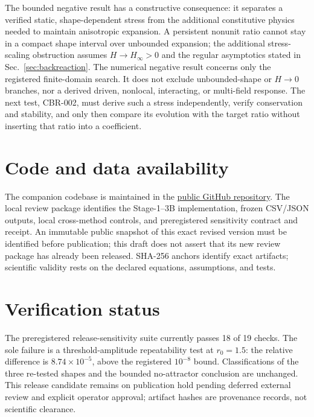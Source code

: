 \documentclass[aps,prd,reprint,superscriptaddress,nofootinbib,floatfix,showkeys]{revtex4-2}
\begin{document}
The bounded negative result has a constructive consequence: it separates a
verified static, shape-dependent stress from the additional constitutive
physics needed to maintain anisotropic expansion. A persistent nonunit ratio
cannot stay in a compact shape interval over unbounded expansion; the
additional stress-scaling obstruction assumes \(H\to H_\infty>0\) and the
regular asymptotics stated in Sec.~\ref{sec:backreaction}. The numerical
negative result concerns only the registered finite-domain search. It does
not exclude unbounded-shape or \(H\to0\) branches, nor a derived
driven, nonlocal, interacting, or multi-field response.  The next test,
CBR-002, must derive such a stress independently, verify conservation and
stability, and only then compare its evolution with the target ratio without
inserting that ratio into a coefficient.

\section*{Code and data availability}

\begingroup
\raggedright
The companion codebase is maintained in the
\href{https://github.com/brendohxd/ITSM-Integrated-Toroidal-Syntropic-Model}{public GitHub repository}.
The local review package identifies the Stage-1--3B implementation, frozen
CSV/JSON outputs, local cross-method controls, and preregistered sensitivity
contract and receipt. An immutable public snapshot of this exact revised
version must be identified before publication; this draft does not assert
that its new review package has already been released.
SHA-256 anchors identify exact artifacts; scientific validity rests on the
declared equations, assumptions, and tests.
\par
\endgroup

\section*{Verification status}

The preregistered release-sensitivity suite currently passes 18 of 19 checks.
The sole failure is a threshold-amplitude repeatability test at \(r_0=1.5\):
the relative difference is \(8.74\times10^{-5}\), above the registered
\(10^{-8}\) bound. Classifications of the three re-tested shapes and the bounded
no-attractor conclusion are unchanged.  This release candidate remains on
publication hold pending deferred external review and explicit operator
approval; artifact hashes are provenance records, not scientific clearance.
\end{document}
